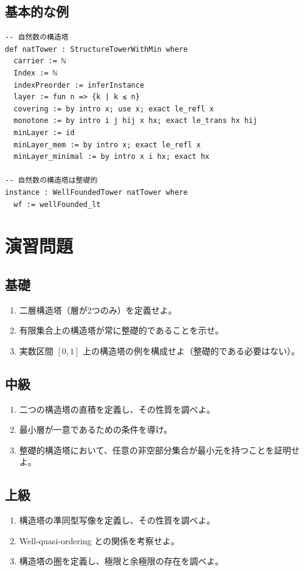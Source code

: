 \documentclass[a4paper,12pt]{ltjsarticle}
\begin{document}
\subsection{基本的な例}

\begin{lstlisting}[style=leanstyle]
-- 自然数の構造塔
def natTower : StructureTowerWithMin where
  carrier := ℕ
  Index := ℕ
  indexPreorder := inferInstance
  layer := fun n => {k | k ≤ n}
  covering := by intro x; use x; exact le_refl x
  monotone := by intro i j hij x hx; exact le_trans hx hij
  minLayer := id
  minLayer_mem := by intro x; exact le_refl x
  minLayer_minimal := by intro x i hx; exact hx

-- 自然数の構造塔は整礎的
instance : WellFoundedTower natTower where
  wf := wellFounded_lt
\end{lstlisting}

\section{演習問題}

\subsection{基礎}

\begin{enumerate}
    \item 二層構造塔（層が2つのみ）を定義せよ。
    \item 有限集合上の構造塔が常に整礎的であることを示せ。
    \item 実数区間 $[0, 1]$ 上の構造塔の例を構成せよ（整礎的である必要はない）。
\end{enumerate}

\subsection{中級}

\begin{enumerate}
    \item 二つの構造塔の直積を定義し、その性質を調べよ。
    \item 最小層が一意であるための条件を導け。
    \item 整礎的構造塔において、任意の非空部分集合が最小元を持つことを証明せよ。
\end{enumerate}

\subsection{上級}

\begin{enumerate}
    \item 構造塔の準同型写像を定義し、その性質を調べよ。
    \item Well-quasi-ordering との関係を考察せよ。
    \item 構造塔の圏を定義し、極限と余極限の存在を調べよ。
\end{enumerate}
\end{document}
